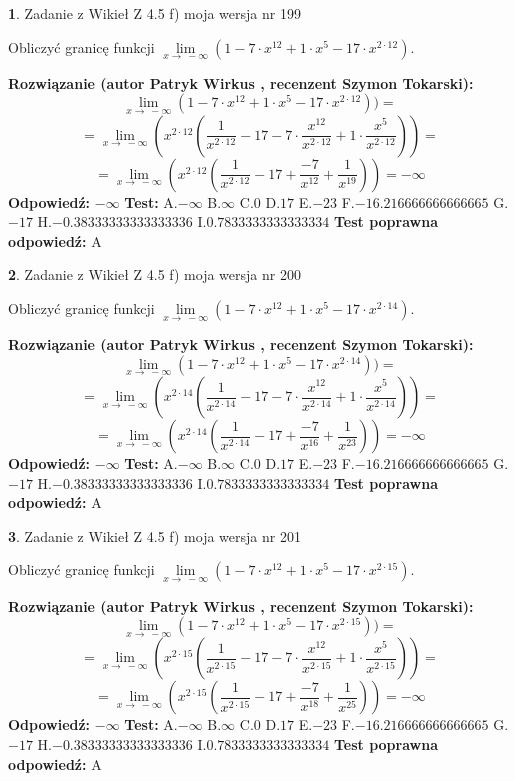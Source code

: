 \documentclass[12pt, a4paper]{article}
\theoremstyle{definition} %
\newtheorem{zad}{}
\newcommand{\zadStart}[1]{\begin{zad}#1\newline}
\newcommand{\zadStop}{\end{zad}}
\newcommand{\rozwStart}[2]{\noindent \textbf{Rozwiązanie (autor #1 , recenzent #2): }\newline}
\newcommand{\rozwStop}{\newline}
\newcommand{\odpStart}{\noindent \textbf{Odpowiedź:}\newline}
\newcommand{\odpStop}{\newline}
\newcommand{\testStart}{\noindent \textbf{Test:}\newline}
\newcommand{\testStop}{\newline}
\newcommand{\kluczStart}{\noindent \textbf{Test poprawna odpowiedź:}\newline}
\newcommand{\kluczStop}{\newline}
\begin{document}
\zadStart{Zadanie z Wikieł Z 4.5 f) moja wersja nr 199}


Obliczyć granicę funkcji  $\lim\limits_{x\to\ -\infty}(1 - 7 \cdot x^{12}+1 \cdot x^{5}- 17 \cdot x^{2\cdot12})$.
\zadStop
\rozwStart{Patryk Wirkus}{Szymon Tokarski}
$$\lim\limits_{x\to\ -\infty}(1 - 7 \cdot x^{12}+1 \cdot x^{5}- 17 \cdot x^{2\cdot12}))=$$
$$=\lim\limits_{x\to\ -\infty}(x^{2\cdot12}(\frac{1}{x^{2\cdot12}}-17 -7 \cdot \frac{x^{12}}{x^{2\cdot12}}+1 \cdot \frac{x^{5}}{x^{2\cdot12}}))=$$
$$=\lim\limits_{x\to\ -\infty}(x^{2\cdot12}(\frac{1}{x^{2\cdot12}}-17 + \frac{-7}{x^{12}}+ \frac{1}{x^{19}}))=-\infty$$
\rozwStop
\odpStart
$-\infty$
\odpStop
\testStart
A.$-\infty$ B.$\infty$ C.$0$ D.$17$ E.$-23$
F.$-16.216666666666665$ G.$-17$
H.$-0.38333333333333336$
I.$0.7833333333333334$
\testStop
\kluczStart
A
\kluczStop



\zadStart{Zadanie z Wikieł Z 4.5 f) moja wersja nr 200}


Obliczyć granicę funkcji  $\lim\limits_{x\to\ -\infty}(1 - 7 \cdot x^{12}+1 \cdot x^{5}- 17 \cdot x^{2\cdot14})$.
\zadStop
\rozwStart{Patryk Wirkus}{Szymon Tokarski}
$$\lim\limits_{x\to\ -\infty}(1 - 7 \cdot x^{12}+1 \cdot x^{5}- 17 \cdot x^{2\cdot14}))=$$
$$=\lim\limits_{x\to\ -\infty}(x^{2\cdot14}(\frac{1}{x^{2\cdot14}}-17 -7 \cdot \frac{x^{12}}{x^{2\cdot14}}+1 \cdot \frac{x^{5}}{x^{2\cdot14}}))=$$
$$=\lim\limits_{x\to\ -\infty}(x^{2\cdot14}(\frac{1}{x^{2\cdot14}}-17 + \frac{-7}{x^{16}}+ \frac{1}{x^{23}}))=-\infty$$
\rozwStop
\odpStart
$-\infty$
\odpStop
\testStart
A.$-\infty$ B.$\infty$ C.$0$ D.$17$ E.$-23$
F.$-16.216666666666665$ G.$-17$
H.$-0.38333333333333336$
I.$0.7833333333333334$
\testStop
\kluczStart
A
\kluczStop



\zadStart{Zadanie z Wikieł Z 4.5 f) moja wersja nr 201}


Obliczyć granicę funkcji  $\lim\limits_{x\to\ -\infty}(1 - 7 \cdot x^{12}+1 \cdot x^{5}- 17 \cdot x^{2\cdot15})$.
\zadStop
\rozwStart{Patryk Wirkus}{Szymon Tokarski}
$$\lim\limits_{x\to\ -\infty}(1 - 7 \cdot x^{12}+1 \cdot x^{5}- 17 \cdot x^{2\cdot15}))=$$
$$=\lim\limits_{x\to\ -\infty}(x^{2\cdot15}(\frac{1}{x^{2\cdot15}}-17 -7 \cdot \frac{x^{12}}{x^{2\cdot15}}+1 \cdot \frac{x^{5}}{x^{2\cdot15}}))=$$
$$=\lim\limits_{x\to\ -\infty}(x^{2\cdot15}(\frac{1}{x^{2\cdot15}}-17 + \frac{-7}{x^{18}}+ \frac{1}{x^{25}}))=-\infty$$
\rozwStop
\odpStart
$-\infty$
\odpStop
\testStart
A.$-\infty$ B.$\infty$ C.$0$ D.$17$ E.$-23$
F.$-16.216666666666665$ G.$-17$
H.$-0.38333333333333336$
I.$0.7833333333333334$
\testStop
\kluczStart
A
\kluczStop
\end{document}
